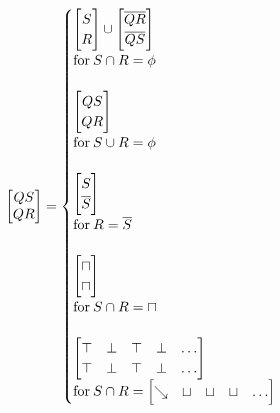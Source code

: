 \documentclass[10pt,journal]{IEEEtran}
\begin{document}
\begin{equation}
 \begin{minipage}{250pt}
\begin{flushleft} $\displaystyle \left[\begin{matrix}QS\\QR\end{matrix}\right]=\begin{cases} \left[\begin{matrix}S\\R\end{matrix}\right] \cup \left[\begin{matrix}\overline{QR}\\\overline{QS}\end{matrix}\right] & \\ \text{for}\: S \cap R = \phi \\ \ \\ \left[\begin{matrix}QS\\QR\end{matrix}\right] & \\ \text{for}\: S \cup R = \phi \\ \ \\ \left[\begin{matrix}S\\\overline{S}\end{matrix}\right] & \\ \text{for}\: R = \overline{S}  \\ \ \\ \left[\begin{matrix}\sqcap\\\sqcap\end{matrix}\right] & \\ \text{for}\: S \cap R = \sqcap\\ \ \\ \left[\begin{matrix}\top & \bot & \top & \bot & \dots\\\top & \bot & \top & \bot & \dots\end{matrix}\right] & \\ \text{for}\: S \cap R = \left[\begin{matrix}\searrow & \sqcup & \sqcup & \sqcup & \dots\end{matrix}\right]\end{cases}$  \end{flushleft}
 \end{minipage}
 \end{equation}
\end{document}
